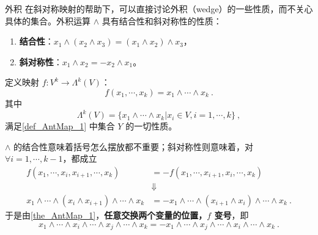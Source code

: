 \begin{example}{外积}\label{ex_AntMap_1}
在斜对称映射的帮助下，可以直接讨论外积（wedge）的一些性质，而不关心具体的集合。外积运算 $\wedge$ 具有结合性和斜对称性的性质：
\begin{enumerate}
\item \textbf{结合性}：$x_1\wedge(x_2\wedge x_3)=(x_1\wedge x_2)\wedge x_3$，
\item \textbf{斜对称性}：$x_1\wedge x_2=-x_2\wedge x_1$。
\end{enumerate}

定义映射 $f:V^k\rightarrow \Lambda^k(V)$：
\begin{equation}
f(x_1,\cdots,x_k)=x_1\wedge\cdots\wedge x_k~.
\end{equation}
其中
\begin{equation}
\Lambda^k(V)=\{x_1\wedge\cdots\wedge x_k| x_i\in V,i=1,\cdots,k\}~,
\end{equation}
满足\autoref{def_AntMap_1} 中集合 $Y$ 的一切性质。

$\wedge$ 的结合性意味着括号怎么摆放都不重要；斜对称性则意味着，对 $\forall i=1,\cdots,k-1$，都成立
\begin{equation}
\begin{aligned}
f(x_1,\cdots,x_i,x_{i+1},\cdots,x_k)&=-f(x_1,\cdots,x_{i+1},x_i,\cdots,x_k)\\
&\Downarrow\\
x_1\wedge\cdots\wedge (x_i\wedge x_{i+1})\wedge\cdots\wedge x_k&=-x_1\wedge\cdots\wedge (x_{i+1}\wedge x_{i})\wedge\cdots\wedge x_k~.
\end{aligned}
\end{equation}
于是由\autoref{the_AntMap_1}，\textbf{任意交换两个变量的位置，$f$ 变号}，即
\begin{equation}
x_1\wedge\cdots\wedge x_i\wedge\cdots\wedge x_j\wedge\cdots\wedge x_k=-x_1\wedge\cdots\wedge x_j\wedge\cdots\wedge x_i\wedge\cdots\wedge x_k~.
\end{equation}



\end{example}
